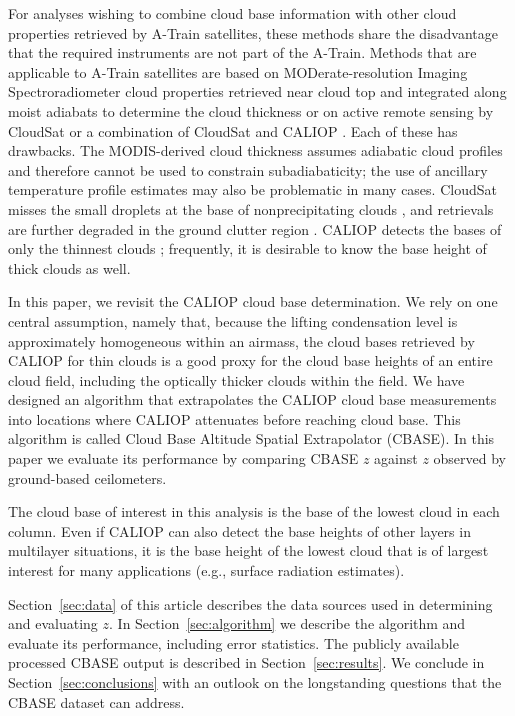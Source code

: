 \documentclass[essd,manuscript]{copernicus}
\begin{document}
For analyses wishing to combine cloud base information with other cloud
properties retrieved by A-Train satellites, these methods share the
disadvantage that the required instruments are not part of the A-Train.
Methods that are applicable to A-Train satellites are based on
MODerate-resolution Imaging Spectroradiometer \citep[MODIS,][]{Platnick2017}
cloud properties retrieved near cloud top and integrated along moist adiabats
to determine the cloud thickness \citep{Meerkoetter2007,Goren2018} or on active remote
sensing by CloudSat \citep[2B-GEOPROF,][]{Marchand2008} or a combination of
CloudSat and CALIOP \citep[2B-GEOPROF-LIDAR,][]{Mace2014}.  Each of these has
drawbacks.  The MODIS-derived cloud thickness assumes adiabatic cloud profiles
and therefore cannot be used to constrain subadiabaticity; the use of
ancillary temperature profile estimates may also be problematic in many cases.
CloudSat misses the small droplets at the base of nonprecipitating clouds
\citep{Sassen2008}, and retrievals are further degraded in the ground clutter
region \citep{Tanelli2008, Marchand2008}.  CALIOP detects the bases of only
the thinnest clouds \citep[$\tau < 5$,][]{Mace2014}; frequently, it is
desirable to know the base height of thick clouds as well.

In this paper, we revisit the CALIOP cloud base determination.  We rely on
one central assumption, namely that, because the lifting condensation level is
approximately homogeneous within an airmass, the cloud bases retrieved by CALIOP
for thin clouds is a good proxy for the cloud base heights of an entire
cloud field, including the optically thicker clouds within the field.  We have
designed an algorithm that extrapolates the CALIOP cloud base measurements into
locations where CALIOP attenuates before reaching cloud base.  This algorithm is
called Cloud Base Altitude Spatial Extrapolator (CBASE).  In this paper we
evaluate its performance by comparing CBASE \ensuremath{z}{} against \ensuremath{z}{} observed by
ground-based ceilometers.

The cloud base of interest in this analysis is the base of the lowest cloud in
each column. Even if CALIOP can also detect the base heights of other layers
in multilayer situations, it is the base height of the lowest cloud that is of
largest interest for many applications (e.g., surface radiation
estimates). 

Section~\ref{sec:data} of this article describes the data sources used in
determining and evaluating \ensuremath{z}{}.  In Section~\ref{sec:algorithm} we describe
the algorithm and evaluate its performance, including error statistics.  The
publicly available processed CBASE output is described in
Section~\ref{sec:results}.  We conclude in Section~\ref{sec:conclusions} with an
outlook on the longstanding questions that the CBASE dataset can address.
\end{document}
